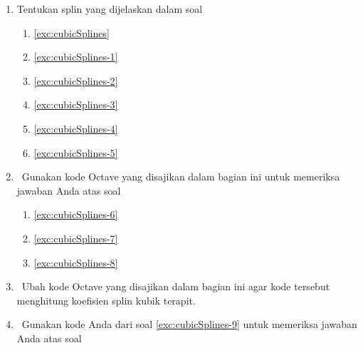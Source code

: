 \begin{enumerate}
\begin{center}
\begin{tabular}{c|c}
$x$ & $f(x)$\tabularnewline
\hline 
$0.1$ & $-0.62$\tabularnewline
$0.2$ & $-0.28$\tabularnewline
$0.3$ & $0.0066$\tabularnewline
$0.4$ & $0.24$\tabularnewline
\end{tabular}
\par\end{center}
\item Tentukan splin yang dijelaskan dalam soal

\begin{enumerate}
\item \label{exc:cubicSplines-6}\ref{exc:cubicSplines} \hasasolution 
\item \label{exc:cubicSplines-7}\ref{exc:cubicSplines-1}
\item \label{exc:cubicSplines-8}\ref{exc:cubicSplines-2} \hasananswer 
\item \label{exc:cubicSplines-10}\ref{exc:cubicSplines-3}
\item \label{exc:cubicSplines-11}\ref{exc:cubicSplines-4} \hasasolution 
\item \label{exc:cubicSplines-12}\ref{exc:cubicSplines-5} \hasananswer 
\end{enumerate}
\item \octave\ Gunakan kode Octave yang disajikan dalam bagian ini untuk
memeriksa jawaban Anda atas soal

\begin{enumerate}
\item \label{exc:cubicSplines-14}\ref{exc:cubicSplines-6} \hasasolution 
\item \ref{exc:cubicSplines-7}
\item \label{exc:cubicSplines-15}\ref{exc:cubicSplines-8} \hasananswer 
\end{enumerate}
\item \octave\ \label{exc:cubicSplines-9}Ubah kode Octave yang disajikan
dalam bagian ini agar kode tersebut menghitung koefisien splin kubik
terapit. \hasasolution 
\item \octave\ Gunakan kode Anda dari soal \ref{exc:cubicSplines-9} untuk
memeriksa jawaban Anda atas soal


\end{enumerate}
